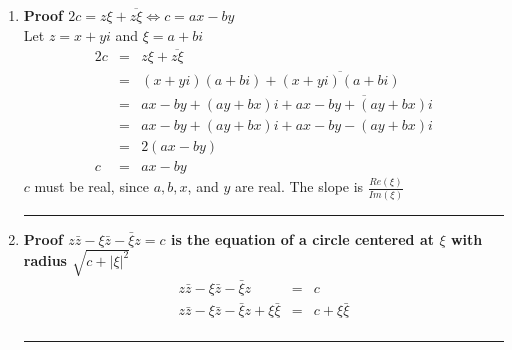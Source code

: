 \documentclass{article}%
\newcommand\abs[1]{\left|#1\right|}
\newenvironment{proof}[1][]{\begin{samepage}\textbf{Proof #1} }{\rule{0.5em}{0.5em} \end{samepage}}
\begin{document}
\begin{enumerate}
\begin{enumerate}[label*=\arabic*.]
\begin{enumerate}[label=\alph*]
            \item %
            \begin{proof}[$\frac{1}{z^2}=\frac{\overline{z^2}}{(z\overline{z})^2}$]
                \\ Let $z=x+yi$
                \begin{eqnarray*}
                    \frac{1}{z^2}&=&\frac{1}{(x+yi)^2} \\
                                 &=&\frac{1}{x^2-y^2+2xyi} \\
                                 &=&\frac{1}{x^2-y^2+2xyi}\frac{x^2-y^2-2xyi}{x^2-y^2-2xyi} \\
                                 &=&\frac{x^2-y^2-2xyi}{(x^2-y^2)^2} \\
                                 &=&\frac{\overline{z^2}}{(z\overline{z})^2}
                \end{eqnarray*}
            \end{proof}
        \end{enumerate}
        \item %
        \begin{proof}[$2c=z\xi+\overline{z\xi} \Leftrightarrow c=ax-by$]
            \\ Let $z=x+yi$ and $\xi=a+bi$
            \begin{eqnarray*}
                2c&=&z\xi + \overline{z\xi} \\
                  &=&(x+yi)(a+bi) + \overline{(x+yi)(a+bi)} \\
                  &=&ax-by+(ay+bx)i+\overline{ax-by+(ay+bx)i} \\
                  &=&ax-by+(ay+bx)i+ax-by-(ay+bx)i \\
                  &=&2(ax-by) \\
                 c&=&ax-by
            \end{eqnarray*}
            $c$ must be real, since $a, b, x$, and $y$ are real. The slope is $\frac{Re(\xi)}{Im(\xi)}$
        \end{proof}
        \item %
        \begin{proof}[$z\bar{z}-\xi\bar{z}-\bar{\xi}z=c$ is the equation of a circle centered at $\xi$ with radius $\sqrt{c + \abs{\xi}^2}$]
            \begin{eqnarray*}
                z\bar{z}-\xi\bar{z}-\bar{\xi}z                 &=& c \\
                z\bar{z}-\xi\bar{z}-\bar{\xi}z + \xi \bar{\xi} &=& c + \xi \bar{\xi} \\

\end{eqnarray*}
\end{proof}
\end{enumerate}
\end{enumerate}
\end{document}
